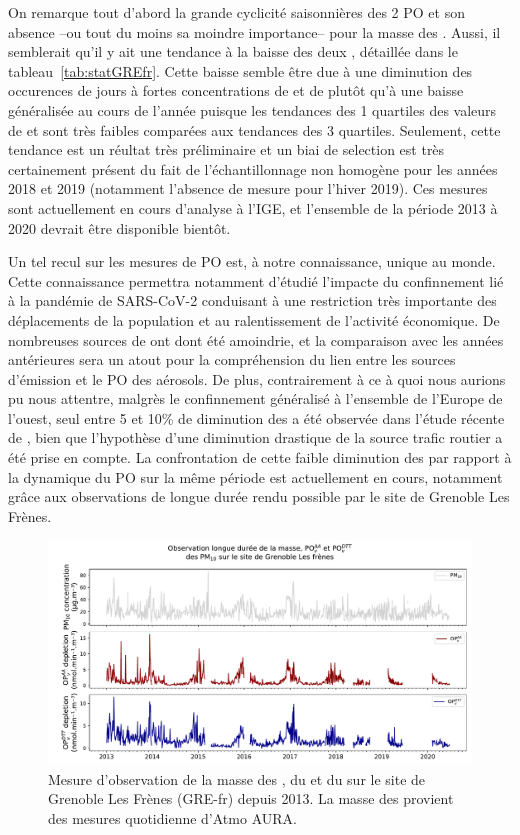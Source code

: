 On remarque tout d'abord la grande cyclicité saisonnières des 2 PO et son absence --ou
tout du moins sa moindre importance-- pour la masse des \PMdix.
Aussi, il semblerait qu'il y ait une tendance à la baisse des deux \POv, détaillée dans le
tableau~\ref{tab:statGREfr}. Cette baisse semble être due à une diminution des occurences
de jours à fortes concentrations de \PMdix{} et de \POv{} plutôt qu'à une baisse
généralisée au cours de l'année puisque les tendances des 1\iers{} quartiles des valeurs de
\POv{} et \PMdix{} sont très faibles comparées aux tendances des 3\iemes{} quartiles.
Seulement, cette tendance est un réultat très préliminaire et un biai de selection est
très certainement présent du fait de l'échantillonnage non homogène pour les années 2018
et 2019 (notamment l'absence de mesure pour l'hiver 2019).
Ces mesures sont actuellement en cours d'analyse à l'IGE, et l'ensemble de la période 2013
à 2020 devrait être disponible bientôt.

Un tel recul sur les mesures de PO est, à notre connaissance, unique au monde. Cette
connaissance permettra notamment d'étudié l'impacte du confinnement lié à la pandémie de
SARS-CoV-2 conduisant à une restriction très importante des déplacements de la population
et au ralentissement de l'activité économique. De nombreuses sources de \PMdix{} ont dont
été amoindrie, et la comparaison avec les années antérieures sera un atout pour la
compréhension du lien entre les sources d'émission et le PO des aérosols. De plus,
contrairement à ce à quoi nous aurions pu nous attentre, malgrès le confinnement
généralisé à l'ensemble de l'Europe de l'ouest, seul entre 5 et 10\% de diminution
des \PMdc{} a été observée dans l'étude récente de \cite{menutImpact2020}, bien que
l'hypothèse d'une diminution drastique de la source trafic routier a été prise en compte.
La confrontation de cette faible diminution des \PMdc{} par rapport à la
dynamique du PO sur la même période est actuellement en cours, notamment grâce aux
observations de longue durée rendu possible par le site de Grenoble Les Frènes.

\begin{figure}[ht]
    \centering
    \includegraphics[width=1.0\linewidth]{figures/chapter04/frenes.pdf}
    \caption{Mesure d'observation de la masse des \PMdix, du \POAA{} et du \PODTT{} sur le
    site de Grenoble Les Frènes (GRE-fr) depuis 2013. La masse des \PMdix{} provient des
mesures quotidienne d'Atmo AURA.}%
\label{fig:TSGREfr}
\end{figure}

